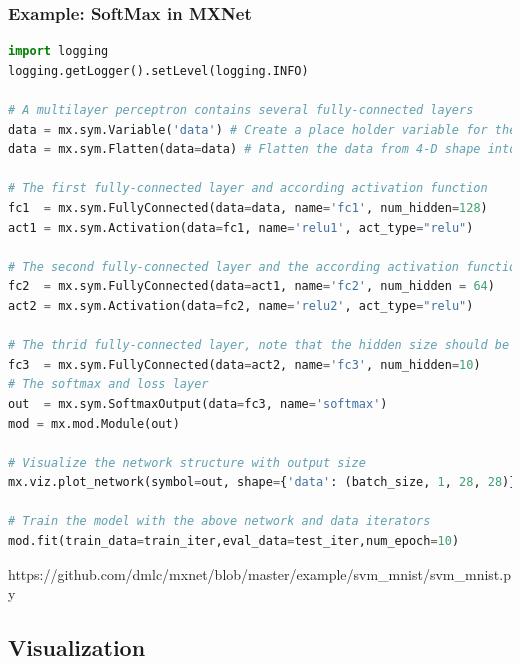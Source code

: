 \begin{frame}[fragile]
  \MyLogo
  \frametitle{Example: SoftMax in MXNet}  

\ContinueLineNumber
\scriptsize{
\begin{lstlisting}[language=python]
import logging
logging.getLogger().setLevel(logging.INFO)

# A multilayer perceptron contains several fully-connected layers
data = mx.sym.Variable('data') # Create a place holder variable for the input data
data = mx.sym.Flatten(data=data) # Flatten the data from 4-D shape into 2-D

# The first fully-connected layer and according activation function
fc1  = mx.sym.FullyConnected(data=data, name='fc1', num_hidden=128) 
act1 = mx.sym.Activation(data=fc1, name='relu1', act_type="relu")

# The second fully-connected layer and the according activation function
fc2  = mx.sym.FullyConnected(data=act1, name='fc2', num_hidden = 64)
act2 = mx.sym.Activation(data=fc2, name='relu2', act_type="relu")

# The thrid fully-connected layer, note that the hidden size should be 10
fc3  = mx.sym.FullyConnected(data=act2, name='fc3', num_hidden=10)
# The softmax and loss layer
out  = mx.sym.SoftmaxOutput(data=fc3, name='softmax')
mod = mx.mod.Module(out)

# Visualize the network structure with output size
mx.viz.plot_network(symbol=out, shape={'data': (batch_size, 1, 28, 28)}).view()

# Train the model with the above network and data iterators
mod.fit(train_data=train_iter,eval_data=test_iter,num_epoch=10)

\end{lstlisting}
}
\begin{center}
{\color{red}\scriptsize
https://github.com/dmlc/mxnet/blob/master/example/svm\_mnist/svm\_mnist.py
}
\end{center}

\end{frame}


\subsection{Visualization}

